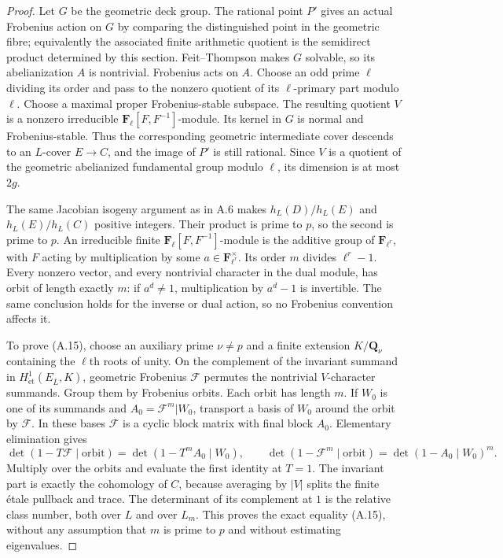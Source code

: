 \documentclass[11pt]{article}
\begin{document}
\begin{proof}
Let $G$ be the geometric deck group.  The rational point $P'$ gives an
actual Frobenius action on $G$ by comparing the distinguished point in
the geometric fibre; equivalently the associated finite arithmetic
quotient is the semidirect product determined by this section.
Feit--Thompson makes $G$ solvable, so its abelianization $A$ is
nontrivial.  Frobenius acts on $A$.  Choose an odd prime $\ell$ dividing
its order and pass to the nonzero quotient of its $\ell$-primary part
modulo $\ell$.  Choose a maximal proper Frobenius-stable subspace.
The resulting quotient $V$ is a nonzero irreducible
$\mathbf F_\ell[F,F^{-1}]$-module.  Its kernel in $G$ is normal and
Frobenius-stable.  Thus the corresponding geometric intermediate cover
descends to an $L$-cover $E\to C$, and the image of $P'$ is still
rational.  Since $V$ is a quotient of the geometric abelianized
fundamental group modulo $\ell$, its dimension is at most $2g$.

The same Jacobian isogeny argument as in A.6 makes
$h_L(D)/h_L(E)$ and $h_L(E)/h_L(C)$ positive integers.  Their product is
prime to $p$, so the second is prime to $p$.  An irreducible finite
$\mathbf F_\ell[F,F^{-1}]$-module is the additive group of
$\mathbf F_{\ell^r}$, with $F$ acting by multiplication by some
$a\in\mathbf F_{\ell^r}^{\times}$.  Its order $m$ divides
$\ell^r-1$.  Every nonzero vector, and every nontrivial character in
the dual module, has orbit of length exactly $m$: if $a^d\ne1$,
multiplication by $a^d-1$ is invertible.  The same conclusion holds for
the inverse or dual action, so no Frobenius convention affects it.

To prove (A.15), choose an auxiliary prime $\nu\ne p$ and a finite
extension $K/\mathbf Q_\nu$ containing the $\ell$th roots of unity.
On the complement of the invariant summand in
$H^1_{\mathrm{\acute et}}(E_{\overline L},K)$, geometric Frobenius
$\mathcal F$ permutes the nontrivial $V$-character summands.  Group them
by Frobenius orbits.  Each orbit has length $m$.  If $W_0$ is one of
its summands and $A_0=\mathcal F^m|W_0$, transport a basis of $W_0$
around the orbit by $\mathcal F$.  In these bases $\mathcal F$ is a
cyclic block matrix with final block $A_0$.  Elementary elimination
gives
\[
 \det(1-T\mathcal F\mid\text{orbit})
       =\det(1-T^m A_0\mid W_0),\qquad
 \det(1-\mathcal F^m\mid\text{orbit})
       =\det(1-A_0\mid W_0)^m.
\]
Multiply over the orbits and evaluate the first identity at $T=1$.
The invariant part is exactly the cohomology of $C$, because averaging
by $|V|$ splits the finite \'etale pullback and trace.  The determinant
of its complement at $1$ is the relative class number, both over $L$
and over $L_m$.  This proves the exact equality (A.15), without any
assumption that $m$ is prime to $p$ and without estimating eigenvalues.


\end{proof}
\end{document}
